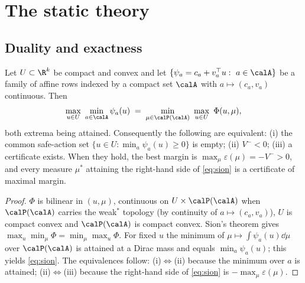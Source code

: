 \section{The static theory}\label{sec:static}

\subsection{Duality and exactness}

\begin{theorem}\label{thm:dual}
Let $U\subset\R^k$ be compact and convex and let $\{\psi_a=c_a+v_a^\top u:\ a\in\calA\}$ be a family of affine rows indexed by a compact set $\calA$ with $a\mapsto(c_a,v_a)$ continuous. Then
\begin{equation}\label{eq:sion}
\max_{u\in U}\ \min_{a\in\calA}\psi_a(u)\;=\;\min_{\mu\in\calP(\calA)}\ \max_{u\in U}\ \Phi(u,\mu),
\end{equation}
both extrema being attained. Consequently the following are equivalent: (i) the common safe-action set $\{u\in U:\min_a\psi_a(u)\ge0\}$ is empty; (ii) $V^-<0$; (iii) a certificate exists. When they hold, the best margin is $\max_\mu\varepsilon(\mu)=-V^->0$, and every measure $\mu^\ast$ attaining the right-hand side of \eqref{eq:sion} is a certificate of maximal margin.
\end{theorem}

\begin{proof}
$\Phi$ is bilinear in $(u,\mu)$, continuous on $U\times\calP(\calA)$ when $\calP(\calA)$ carries the weak$^\ast$ topology (by continuity of $a\mapsto(c_a,v_a)$), $U$ is compact convex and $\calP(\calA)$ is compact convex. Sion's theorem \cite{Sion1958} gives $\max_u\min_\mu\Phi=\min_\mu\max_u\Phi$. For fixed $u$ the minimum of $\mu\mapsto\int\psi_a(u)\dd\mu$ over $\calP(\calA)$ is attained at a Dirac mass and equals $\min_a\psi_a(u)$; this yields \eqref{eq:sion}. The equivalences follow: (i)$\Leftrightarrow$(ii) because the minimum over $a$ is attained; (ii)$\Leftrightarrow$(iii) because the right-hand side of \eqref{eq:sion} is $-\max_\mu\varepsilon(\mu)$.
\end{proof}

